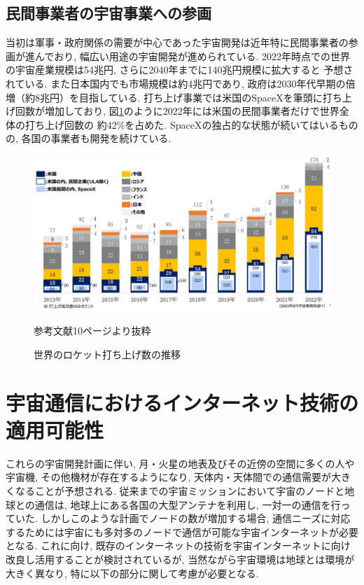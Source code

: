 \subsection{民間事業者の宇宙事業への参画}
\label{section:民間事業者の宇宙事業への参画}
当初は軍事・政府関係の需要が中心であった宇宙開発は近年特に民間事業者の参画が進んでおり,
幅広い用途の宇宙開発が進められている. 
2022年時点での世界の宇宙産業規模は54兆円, さらに2040年までに140兆円規模に拡大すると
予想されている\cite{経産省2024}. また日本国内でも市場規模は約4兆円であり, 政府は2030年代早期の倍増（約8兆円）を目指している. 
打ち上げ事業では米国のSpaceXを筆頭に打ち上げ回数が増加しており, 
図\ref{fig:number_satellite_launched}のように2022年には米国の民間事業者だけで世界全体の打ち上げ回数の
約42\%を占めた. SpaceXの独占的な状態が続いてはいるものの, 各国の事業者も開発を続けている. 
\begin{figure}[tbh]
    \centering
    \includegraphics[width=0.7\textheight]{img/number_satellite_launched.pdf}
    \caption{世界のロケット打ち上げ数の推移}
    \label{fig:number_satellite_launched}
    \begin{minipage}{\textwidth}
        \centering
        \vspace{3mm}
        \fontsize{10pt}{12pt}\selectfont
        参考文献\cite{内閣府2023}10ページより抜粋
    \end{minipage}
\end{figure}


\section{宇宙通信におけるインターネット技術の適用可能性}
\label{section:宇宙通信におけるインターネット技術の適用性}
これらの宇宙開発計画に伴い,  月・火星の地表及びその近傍の空間に多くの人や宇宙機, その他機材が存在するようになり, 
天体内・天体間での通信需要が大きくなることが予想される.  
従来までの宇宙ミッションにおいて宇宙のノードと地球との通信は,  地球上にある各国の大型アンテナを利用し,  一対一の通信を行っていた. 
しかしこのような計画でノードの数が増加する場合, 通信ニーズに対応するためには宇宙にも多対多のノードで通信が可能な宇宙インターネットが必要となる.  
これに向け, 既存のインターネットの技術を宇宙インターネットに向け改良し活用することが検討されているが, 
当然ながら宇宙環境は地球とは環境が大きく異なり, 特に以下の部分に関して考慮が必要となる. 

